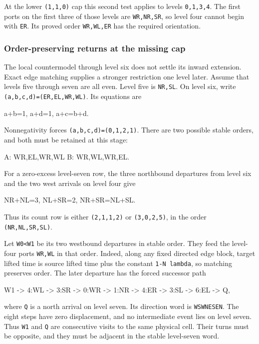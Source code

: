 \documentclass[11pt,letterpaper]{article}
\theoremstyle{plain}
\theoremstyle{definition}
\begin{document}
\begin{NoHyper}
At the lower \texttt{(1,1,0)} cap this second test applies to levels \texttt{0,1,3,4}. The first ports on the first three of those levels are \texttt{WR,NR,SR}, so level four cannot begin with \texttt{ER}. Its proved order \texttt{WR,WL,ER} has the required orientation.

\subsubsection{Order-preserving returns at the missing cap}

The local countermodel through level six does not settle its inward extension. Exact edge matching supplies a stronger restriction one level later. Assume that levels five through seven are all even. Level five is \texttt{NR,SL}. On level six, write \texttt{(a,b,c,d)=(ER,EL,WR,WL)}. Its equations are

\begin{codeblock}
a+b=1,       a+d=1,       a+c=b+d.
\end{codeblock}

Nonnegativity forces \texttt{(a,b,c,d)=(0,1,2,1)}. There are two possible stable orders, and both must be retained at this stage:

\begin{codeblock}
A: WR,EL,WR,WL
B: WR,WL,WR,EL.
\end{codeblock}

For a zero-excess level-seven row, the three northbound departures from level six and the two west arrivals on level four give

\begin{codeblock}
NR+NL=3,       NL+SR=2,       NR+SR=NL+SL.
\end{codeblock}

Thus its count row is either \texttt{(2,1,1,2)} or \texttt{(3,0,2,5)}, in the order \texttt{(NR,NL,SR,SL)}.

Let \texttt{W0\textless{}W1} be its two westbound departures in stable order. They feed the level-four ports \texttt{WR,WL} in that order. Indeed, along any fixed directed edge block, target lifted time is source lifted time plus the constant \texttt{1-N\ lambda}, so matching preserves order. The later departure has the forced successor path

\begin{codeblock}
W1 -> 4:WL -> 3:SR -> 0:WR -> 1:NR
   -> 4:ER -> 3:SL -> 6:EL -> Q,
\end{codeblock}

where \texttt{Q} is a north arrival on level seven. Its direction word is \texttt{WSWNESEN}. The eight steps have zero displacement, and no intermediate event lies on level seven. Thus \texttt{W1} and \texttt{Q} are consecutive visits to the same physical cell. Their turns must be opposite, and they must be adjacent in the stable level-seven word.


\end{NoHyper}
\end{document}
